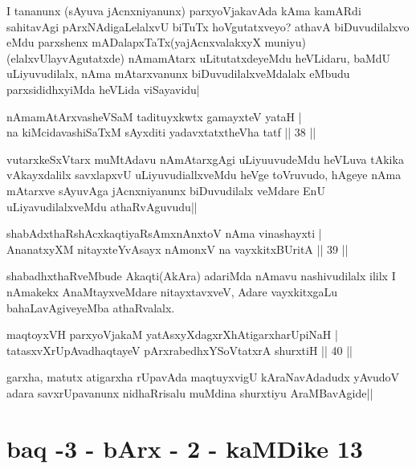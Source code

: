 \begin{artha}
I tananunx (sAyuva jAcnxniyanunx) parxyoVjakavAda kAma kamARdi sahitavAgi pArxNAdigaLelalxvU biTuTx hoVgutatxveyo? athavA biDuvudilalxvo eMdu parxshenx mADalapxTaTx(yajAcnxvalakxyX muniyu)(elalxvUlayvAgutatxde) nAmamAtarx uLitutatxdeyeMdu heVLidaru, baMdU uLiyuvudilalx, nAma mAtarxvanunx biDuvudilalxveMdalalx eMbudu parxsididhxyiMda heVLida viSayavidu|
\end{artha}

\begin{shl}
nAmamAtArxvasheVSaM tadituyxkwtx gamayxteV yataH |\\
na kiMcidavashiSaTxM sAyxditi yadavxtatxtheVha tatf \hfill || 38 ||
\end{shl}

\begin{artha}
vutarxkeSxVtarx muMtAdavu nAmAtarxgAgi uLiyuuvudeMdu heVLuva tAkika vAkayxdalilx savxlapxvU uLiyuvudiallxveMdu heVge toVruvudo, hAgeye nAma mAtarxve sAyuvAga jAcnxniyanunx biDuvudilalx veMdare EnU uLiyavudilalxveMdu athaRvAguvudu||
\end{artha}


\begin{shl}
shabAdxthaRshAcx\s \s kaqtiyaRsAmxnAnxtoV nAma vinashayxti |\\
AnanatxyXM nitayxteYvAsayx nAmonxV na vayxkitxBUritA \hfill || 39 ||
\end{shl}

\begin{artha}
shabadhxthaRveMbude Akaqti(AkAra) adariMda nAmavu nashivudilalx ililx I nAmakekx AnaMtayxveMdare nitayxtavxveV, Adare vayxkitxgaLu bahaLavAgiveyeMba athaRvalalx.
\end{artha}


\begin{shl}
maqtoyxVH parxyoVjakaM yatAsxyXdagxrXhAtigarxharUpiNaH |\\
tatasxvXrUpAvadhaqtayeV pArxrabedhxYSoVtatxrA shurxtiH \hfill || 40 ||
\end{shl}

\begin{artha}
garxha, matutx atigarxha rUpavAda maqtuyxvigU kAraNavAdadudx yAvudoV adara savxrUpavanunx nidhaRrisalu muMdina shurxtiyu AraMBavAgide||
\end{artha}

\section*{baq -3 - bArx - 2 - kaMDike 13}

